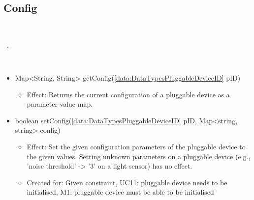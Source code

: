   \subsection{Config}\label{int:MoteMoteConfig}
    \begin{description}
      \item[Provided by:] \iconcomponent{}~
      \item[Required by:] \iconcomponent{}~, \iconcomponent{}~
      \item[Operations:] ~
    \begin{itemize}[noitemsep,nolistsep,leftmargin=-.25cm]
      \item \textsf{Map\textless{}String, String\textgreater{} getConfig(\ref{data:DataTypesPluggableDeviceID} pID)}
        \begin{itemize}[noitemsep,nolistsep]
           \item Effect: Returns the current configuration of a pluggable device as a parameter-value map.
        \end{itemize}
      \item \textsf{boolean setConfig(\ref{data:DataTypesPluggableDeviceID} pID, Map\textless{}string, string\textgreater{} config)}
        \begin{itemize}[noitemsep,nolistsep]
           \item Effect: Set the given configuration parameters of the pluggable device to the given values. Setting unknown parameters on a pluggable device (e.g., 'noise threshold' -> '3' on a light sensor) has no effect.
\item Created for: Given constraint, UC11: pluggable device needs to be initialised, M1: pluggable device must be able to be initialised
        \end{itemize}
    \end{itemize}
    \end{description}

